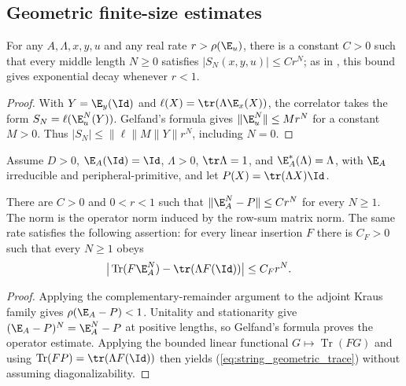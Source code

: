 \subsection{Geometric finite-size estimates}

\begin{lemma}
    \label{thm:physical_string_geometric_decay}
    \leanok
    For any $A,\Lambda,x,y,u$ and any real rate
    $r>\rho(\E_u)$, there is a constant $C>0$ such that every
    middle length $N\geq0$ satisfies $|S_N(x,y,u)|\leq Cr^N$;
    as in \cite[lines~241--243]{PerezGarcia2008StringOrder}, this bound
    gives exponential decay whenever $r<1$.
\end{lemma}
\begin{proof}
    With $Y=\E_y(\Id)$ and $\ell(X)=\tr(\Lambda\E_x(X))$, the correlator
    takes the form $S_N=\ell(\E_u^N(Y))$.
    Gelfand's formula gives $\|\E_u^N\|\leq Mr^N$ for a constant $M>0$.
    Thus $|S_N|\leq\|\ell\|M\|Y\|r^N$, including $N=0$.
\end{proof}

Assume $D>0$, $\E_A(\Id)=\Id$, $\Lambda>0$,
$\tr\Lambda=1$, and $\E_A^*(\Lambda)=\Lambda$, with
$\E_A$ irreducible and peripheral-primitive, and let
$P(X)=\tr(\Lambda X)\Id$.

\begin{lemma}
    \label{thm:canonical_string_geometric_remainder}
    \leanok
    There are $C>0$ and $0<r<1$ such that
    $\|\E_A^N-P\|\leq Cr^N$ for every $N\geq1$.
    The norm is the operator norm induced by the row-sum matrix norm.
    The same rate satisfies the following assertion: for every linear
    insertion $F$ there is $C_F>0$ such that every $N\geq1$ obeys
    \begin{align}
        \big|\operatorname{Tr}(F\E_A^N)-\tr(\Lambda F(\Id))\big|
         & \leq C_F r^N.
        \label{eq:string_geometric_trace}
    \end{align}
\end{lemma}
\begin{proof}
    Applying the complementary-remainder argument to the adjoint Kraus family
    gives $\rho(\E_A-P)<1$. Unitality and stationarity give
    $(\E_A-P)^N=\E_A^N-P$ at positive lengths, so Gelfand's formula
    proves the operator estimate. Applying the bounded linear functional
    $G\mapsto\operatorname{Tr}(FG)$ and using
    $\operatorname{Tr}(FP)=\tr(\Lambda F(\Id))$ then yields
    (\ref{eq:string_geometric_trace}) without assuming diagonalizability.
\end{proof}

